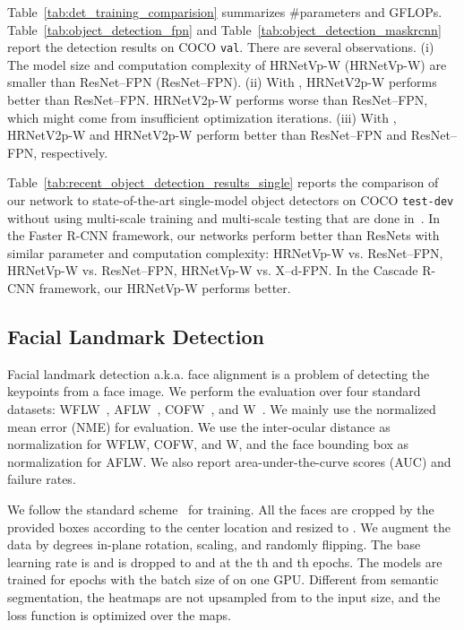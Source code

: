 \documentclass[10pt,twocolumn,letterpaper]{article}
\begin{document}
Table~\ref{tab:det_training_comparision}
summarizes \#parameters and GFLOPs.
Table~\ref{tab:object_detection_fpn}
and Table~\ref{tab:object_detection_maskrcnn}
report the detection results on COCO \texttt{val}.
There are several observations.
(i) The model size and computation complexity of HRNetVp-W (HRNetVp-W)
are smaller than ResNet--FPN (ResNet--FPN).
(ii) With ,
HRNetV2p-W performs better than ResNet--FPN.
HRNetV2p-W performs worse than ResNet--FPN,
which might come from insufficient optimization iterations.
(iii) With , HRNetV2p-W and HRNetV2p-W perform better
than ResNet--FPN and ResNet--FPN, respectively.

 Table~\ref{tab:recent_object_detection_results_single}
reports the comparison
of our network to state-of-the-art single-model object detectors on COCO \texttt{test-dev} without
using multi-scale training and
multi-scale testing that are done in~\cite{LIUQQSJ18, QiLSJ18, LiCYD18, SinghND18,SinghD18,PengXLJZJYS18}.
In the Faster R-CNN framework,
our networks perform better than ResNets with similar
parameter and computation complexity:
HRNetVp-W vs. ResNet--FPN,
HRNetVp-W vs. ResNet--FPN,
HRNetVp-W vs. X--d-FPN.
In the Cascade R-CNN framework,
our HRNetVp-W performs better.

\subsection{Facial Landmark Detection}
Facial landmark detection
a.k.a. face alignment
is a problem of detecting the keypoints
from a face image.
We perform the evaluation over
four standard datasets:
WFLW~\cite{Wu0YWC018},
AFLW~\cite{KostingerWRB11},
COFW~\cite{Burgos-ArtizzuPD13},
and W~\cite{SagonasTZP13}.
We mainly use the normalized mean error (NME) for evaluation.
We use the inter-ocular distance as normalization
for WFLW, COFW, and W, and the face bounding box as normalization
for AFLW.
We also report area-under-the-curve scores (AUC) and failure rates.

We follow the standard scheme~\cite{Wu0YWC018} for training.
All the faces are cropped by the provided boxes according
to the center location and resized to .
We augment the data by  degrees in-plane rotation,
 scaling, and
randomly flipping.
The base learning rate is  and is dropped to
 and  at the th and th epochs. The models
are trained for  epochs with the batch size of  on
one GPU. Different from semantic segmentation,
the heatmaps are not upsampled from  to the input size,
and the loss function is optimized over
the  maps.
\end{document}
